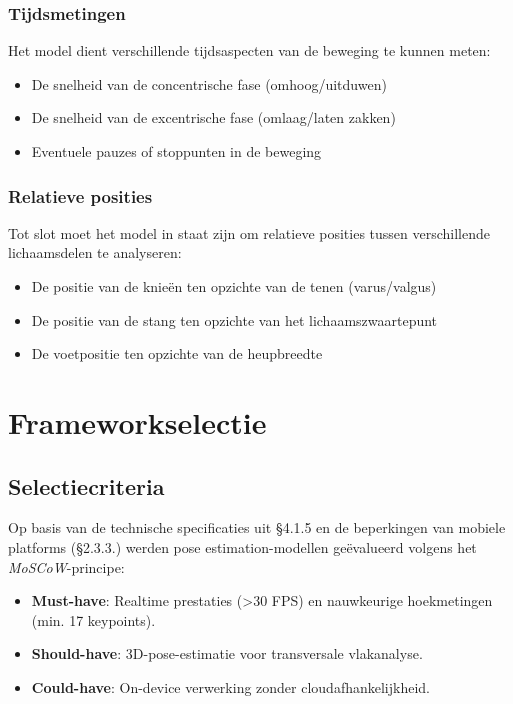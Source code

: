 \subsubsection{Tijdsmetingen}
Het model dient verschillende tijdsaspecten van de beweging te kunnen meten:
\begin{itemize}
    \item De snelheid van de concentrische fase (omhoog/uitduwen)
    \item De snelheid van de excentrische fase (omlaag/laten zakken)
    \item Eventuele pauzes of stoppunten in de beweging
\end{itemize}

\subsubsection{Relatieve posities}
Tot slot moet het model in staat zijn om relatieve posities tussen verschillende lichaamsdelen te analyseren:
\begin{itemize}
    \item De positie van de knieën ten opzichte van de tenen (varus/valgus)
    \item De positie van de stang ten opzichte van het lichaamszwaartepunt
    \item De voetpositie ten opzichte van de heupbreedte
\end{itemize}

\section{Frameworkselectie}
\subsection{Selectiecriteria}

Op basis van de technische specificaties uit §4.1.5 en de beperkingen van mobiele platforms (§2.3.3.) werden pose estimation-modellen geëvalueerd volgens het \textit{MoSCoW}-principe:

\begin{itemize}
\item \textbf{Must-have}: Realtime prestaties (>30 FPS) en nauwkeurige hoekmetingen (min. 17 keypoints).
\item \textbf{Should-have}: 3D-pose-estimatie voor transversale vlakanalyse.
\item \textbf{Could-have}: On-device verwerking zonder cloudafhankelijkheid.
\end{itemize}

